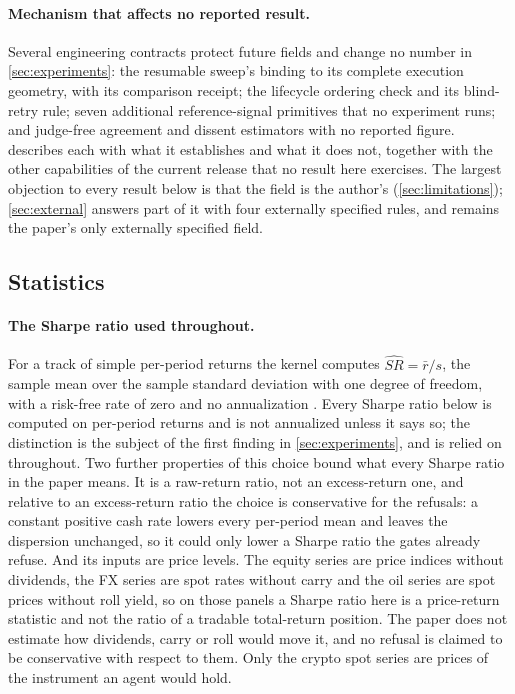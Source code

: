 \paragraph{Mechanism that affects no reported result.} Several engineering contracts protect future fields and change no number in \cref{sec:experiments}: the resumable sweep's binding to its complete execution geometry, with its comparison receipt; the lifecycle ordering check and its blind-retry rule; seven additional reference-signal primitives that no experiment runs; and judge-free agreement and dissent estimators with no reported figure.  describes each with what it establishes and what it does not, together with the other capabilities of the current release that no result here exercises. The largest objection to every result below is that the field is the author's (\cref{sec:limitations}); \cref{sec:external} answers part of it with four externally specified rules, and remains the paper's only externally specified field.

\subsection{Statistics}\label{sec:stats}

\paragraph{The Sharpe ratio used throughout.} For a track of simple per-period returns the kernel computes $\widehat{SR} = \bar{r}/s$, the sample mean over the sample standard deviation with one degree of freedom, with a risk-free rate of zero and no annualization \citep{sharpe1966mutual,sharpe1994sharpe}. Every Sharpe ratio below is computed on per-period returns and is not annualized unless it says so; the distinction is the subject of the first finding in \cref{sec:experiments}, and is relied on throughout. Two further properties of this choice bound what every Sharpe ratio in the paper means. It is a raw-return ratio, not an excess-return one, and relative to an excess-return ratio the choice is conservative for the refusals: a constant positive cash rate lowers every per-period mean and leaves the dispersion unchanged, so it could only lower a Sharpe ratio the gates already refuse. And its inputs are price levels. The equity series are price indices without dividends, the FX series are spot rates without carry and the oil series are spot prices without roll yield, so on those panels a Sharpe ratio here is a price-return statistic and not the ratio of a tradable total-return position. The paper does not estimate how dividends, carry or roll would move it, and no refusal is claimed to be conservative with respect to them. Only the crypto spot series are prices of the instrument an agent would hold.

